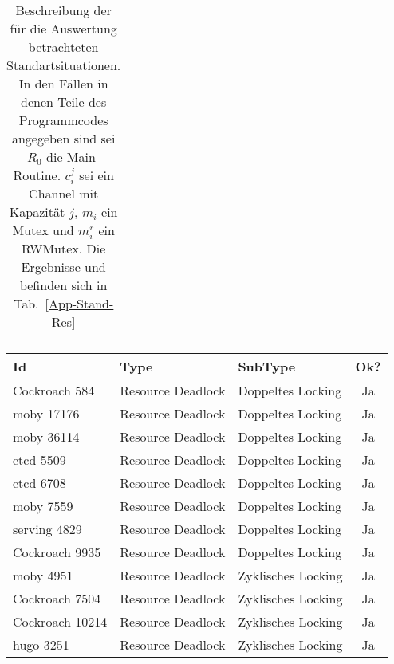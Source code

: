 \begin{longtable}[h]{|l|l|c|}
  \caption{Beschreibung der für die Auswertung betrachteten 
  Standartsituationen. In den Fällen in denen 
  Teile des Programmcodes angegeben sind sei $R_0$ die Main-Routine. $c_i^j$
  sei ein Channel mit Kapazität $j$, $m_i$ ein Mutex und $m_i^r$ ein RWMutex.
  Die Ergebnisse und befinden sich in Tab.~\ref{App-Stand-Res}}
  \label{App-Stand-Des}
\end{longtable}


\newpage

\begin{longtable}[c]{|l|l|l|c|}
  \hline
  \textbf{Id} & \textbf{Type}  & \textbf{SubType}    & \multicolumn{1}{l|}{\textbf{Ok?}} \\ \hline
  \endfirsthead
  \endhead
  Cockroach 584      & Resource Deadlock      & Doppeltes Locking      & Ja                                   \\ \hline
  moby 17176      & Resource Deadlock      & Doppeltes Locking      & Ja                                   \\ \hline
  moby 36114      & Resource Deadlock      & Doppeltes Locking      & Ja                                   \\ \hline
  etcd 5509      & Resource Deadlock      & Doppeltes Locking      & Ja                                   \\ \hline
  etcd 6708      & Resource Deadlock      & Doppeltes Locking      & Ja                                   \\ \hline
  moby 7559      & Resource Deadlock      & Doppeltes Locking      & Ja                                   \\ \hline
  serving 4829      & Resource Deadlock      & Doppeltes Locking      & Ja                                   \\ \hline
  Cockroach 9935      & Resource Deadlock      & Doppeltes Locking      & Ja                                   \\ \hline
  moby 4951      & Resource Deadlock      & Zyklisches Locking     & Ja                                   \\ \hline
  Cockroach 7504      & Resource Deadlock      & Zyklisches Locking     & Ja                                   \\ \hline
  Cockroach 10214      & Resource Deadlock      & Zyklisches Locking     & Ja                                   \\ \hline
  hugo 3251      & Resource Deadlock      & Zyklisches Locking     & Ja                                   \\ \hline

\end{longtable}
